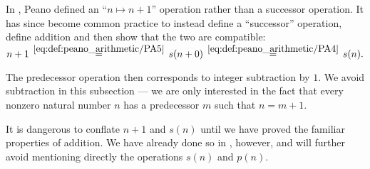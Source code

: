 \begin{remark}\label{rem:natural_number_successor_via_addition}
  In \cite[1]{Peano1889}, Peano defined an \enquote{\( n \mapsto n + 1 \)} operation rather than a successor operation. It has since become common practice to instead define a \enquote{successor} operation, define addition and then show that the two are compatible:
  \begin{equation*}
    n + 1
    \reloset {\eqref{eq:def:peano_arithmetic/PA5}} =
    s(n + 0)
    \reloset {\eqref{eq:def:peano_arithmetic/PA4}} =
    s(n).
  \end{equation*}

  The predecessor operation then corresponds to integer subtraction by \( 1 \). We avoid subtraction in this subsection --- we are only interested in the fact that every nonzero natural number \( n \) has a predecessor \( m \) such that \( n = m + 1 \).

  It is dangerous to conflate \( n + 1 \) and \( s(n) \) until we have proved the familiar properties of addition. We have already done so in , however, and will further avoid mentioning directly the operations \( s(n) \) and \( p(n) \).
\end{remark}

